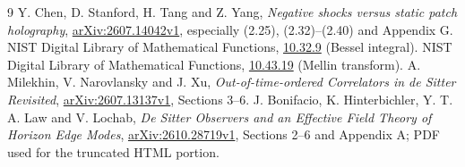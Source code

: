 \documentclass[11pt,a4paper]{article}
\begin{document}
\begin{thebibliography}{9}
 Y. Chen, D. Stanford, H. Tang and Z. Yang,
\emph{Negative shocks versus static patch holography},
\href{https://arxiv.org/abs/2607.14042v1}{arXiv:2607.14042v1},
especially (2.25), (2.32)--(2.40) and Appendix G.
 NIST Digital Library of Mathematical Functions,
\href{https://dlmf.nist.gov/10.32.E9}{10.32.9} (Bessel integral).
 NIST Digital Library of Mathematical Functions,
\href{https://dlmf.nist.gov/10.43.E19}{10.43.19} (Mellin transform).
 A. Milekhin, V. Narovlansky and J. Xu,
\emph{Out-of-time-ordered Correlators in de Sitter Revisited},
\href{https://arxiv.org/abs/2607.13137v1}{arXiv:2607.13137v1},
Sections 3--6.
 J. Bonifacio, K. Hinterbichler, Y. T. A. Law and V. Lochab,
\emph{De Sitter Observers and an Effective Field Theory of Horizon Edge Modes},
\href{https://arxiv.org/abs/2610.28719v1}{arXiv:2610.28719v1},
Sections 2--6 and Appendix A; PDF used for the truncated HTML portion.
\end{thebibliography}
\end{document}
